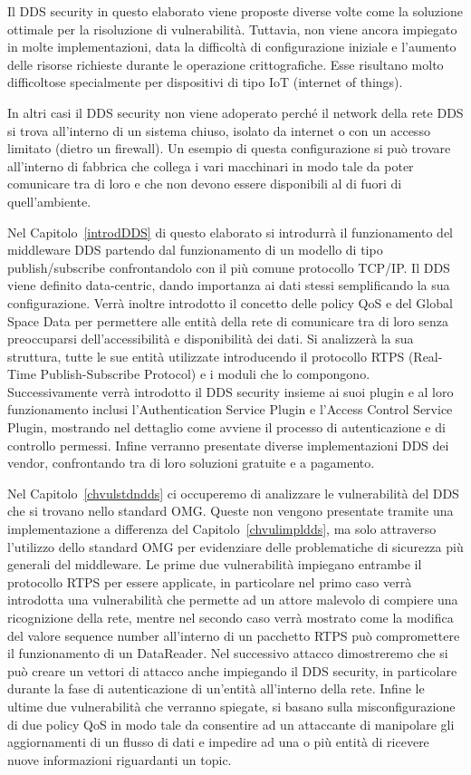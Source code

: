 Il DDS security in questo elaborato viene proposte diverse volte 
come la soluzione ottimale per la risoluzione di vulnerabilità. 
Tuttavia, non viene ancora impiegato in molte implementazioni, 
data la difficoltà di configurazione iniziale e l'aumento 
delle risorse richieste durante le operazione crittografiche. 
Esse risultano molto difficoltose specialmente 
per dispositivi di tipo IoT (internet of things).

In altri casi il DDS security non viene adoperato perché il 
network della rete DDS si trova all'interno di un sistema 
chiuso, isolato da internet o con un accesso limitato 
(dietro un firewall). Un esempio di questa configurazione 
si può trovare all'interno di fabbrica che collega i vari 
macchinari in modo tale da poter comunicare tra di loro e 
che non devono essere disponibili al di fuori di 
quell'ambiente.

Nel Capitolo~\ref{introdDDS} di questo elaborato si introdurrà il 
funzionamento del middleware DDS partendo dal funzionamento 
di un modello di tipo publish/subscribe confrontandolo 
con il più comune protocollo TCP/IP. Il DDS viene definito 
data-centric, dando importanza ai dati stessi semplificando 
la sua configurazione. Verrà inoltre introdotto il concetto 
delle policy QoS e del Global Space Data per permettere 
alle entità della rete di comunicare tra di loro senza preoccuparsi 
dell'accessibilità e disponibilità dei dati. Si analizzerà la sua
struttura, tutte le sue entità utilizzate introducendo il protocollo 
RTPS (Real-Time Publish-Subscribe Protocol) e i moduli che lo compongono.
Successivamente verrà introdotto il DDS security insieme ai suoi 
plugin e al loro funzionamento inclusi l'Authentication Service Plugin e 
l'Access Control Service Plugin, mostrando nel dettaglio come 
avviene il processo di autenticazione e di controllo permessi.
Infine verranno presentate diverse implementazioni DDS dei vendor, 
confrontando tra di loro soluzioni gratuite e a pagamento.

Nel Capitolo~\ref{chvulstdndds} ci occuperemo di analizzare 
le vulnerabilità del DDS che si trovano nello standard OMG. 
Queste non vengono presentate tramite una implementazione 
a differenza del Capitolo~\ref{chvulimpldds}, ma solo attraverso 
l'utilizzo dello standard OMG per evidenziare delle problematiche 
di sicurezza più generali del middleware. Le prime due vulnerabilità 
impiegano entrambe il protocollo RTPS per essere applicate, 
in particolare nel primo caso verrà introdotta una vulnerabilità 
che permette ad un attore malevolo di compiere una ricognizione 
della rete, mentre nel secondo caso verrà mostrato come la modifica del 
valore sequence number all'interno di un pacchetto RTPS può
compromettere
il funzionamento di un DataReader. 
Nel successivo attacco dimostreremo che si può creare un vettori 
di attacco anche impiegando il DDS security, in particolare durante
la fase di autenticazione di un'entità all'interno della rete.
Infine le ultime due vulnerabilità che verranno spiegate, si basano sulla 
misconfigurazione di due policy QoS in modo tale da consentire ad un
attaccante di manipolare gli aggiornamenti di un flusso di dati e 
impedire ad una o più entità di ricevere nuove informazioni riguardanti 
un topic.

